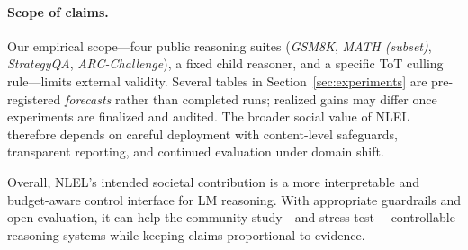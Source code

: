 \documentclass{article}
\theoremstyle{plain}
\theoremstyle{definition}
\theoremstyle{remark}
\begin{document}
\paragraph{Scope of claims.}
Our empirical scope---four public reasoning suites
(\emph{GSM8K}, \emph{MATH (subset)}, \emph{StrategyQA}, \emph{ARC-Challenge}),
a fixed child reasoner, and a specific ToT culling rule---limits external
validity. Several tables in Section~\ref{sec:experiments} are pre-registered
\emph{forecasts} rather than completed runs; realized gains may differ once
experiments are finalized and audited. The broader social value of NLEL
therefore depends on careful deployment with content-level safeguards,
transparent reporting, and continued evaluation under domain shift.

Overall, NLEL’s intended societal contribution is a more interpretable and
budget-aware control interface for LM reasoning. With appropriate guardrails
and open evaluation, it can help the community study---and stress-test---
controllable reasoning systems while keeping claims proportional to
evidence.





\appendix
\end{document}
